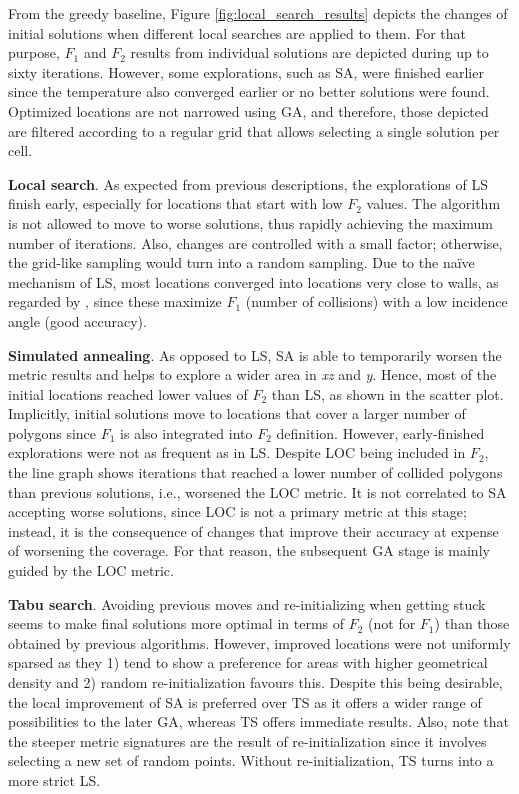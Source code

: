 From the greedy baseline, Figure \ref{fig:local_search_results} depicts the changes of initial solutions when different local searches are applied to them. For that purpose, $F_1$ and $F_2$ results from individual solutions are depicted during up to sixty iterations. However, some explorations, such as SA, were finished earlier since the temperature also converged earlier or no better solutions were found. Optimized locations are not narrowed using GA, and therefore, those depicted are filtered according to a regular grid that allows selecting a single solution per cell.

\textbf{Local search}. As expected from previous descriptions, the explorations of LS finish early, especially for locations that start with low $F_2$ values. The algorithm is not allowed to move to worse solutions, thus rapidly achieving the maximum number of iterations. Also, changes are controlled with a small factor; otherwise, the grid-like sampling would turn into a random sampling. Due to the naïve mechanism of LS, most locations converged into locations very close to walls, as regarded by \cite{soudarissanane_optimizing_2012}, since these maximize $F_1$ (number of collisions) with a low incidence angle (good accuracy).

\textbf{Simulated annealing}. As opposed to LS, SA is able to temporarily worsen the metric results and helps to explore a wider area in \textit{xz} and \textit{y}. Hence, most of the initial locations reached lower values of $F_2$ than LS, as shown in the scatter plot. Implicitly, initial solutions move to locations that cover a larger number of polygons since $F_1$ is also integrated into $F_2$ definition. However, early-finished explorations were not as frequent as in LS. Despite LOC being included in $F_2$, the line graph shows iterations that reached a lower number of collided polygons than previous solutions, i.e., worsened the LOC metric. It is not correlated to SA accepting worse solutions, since LOC is not a primary metric at this stage; instead, it is the consequence of changes that improve their accuracy at expense of worsening the coverage. For that reason, the subsequent GA stage is mainly guided by the LOC metric.

\textbf{Tabu search}. Avoiding previous moves and re-initializing when getting stuck seems to make final solutions more optimal in terms of $F_2$ (not for $F_1$) than those obtained by previous algorithms. However, improved locations were not uniformly sparsed as they 1) tend to show a preference for areas with higher geometrical density and 2) random re-initialization favours this. Despite this being desirable, the local improvement of SA is preferred over TS as it offers a wider range of possibilities to the later GA, whereas TS offers immediate results. Also, note that the steeper metric signatures are the result of re-initialization since it involves selecting a new set of random points. Without re-initialization, TS turns into a more strict LS.

